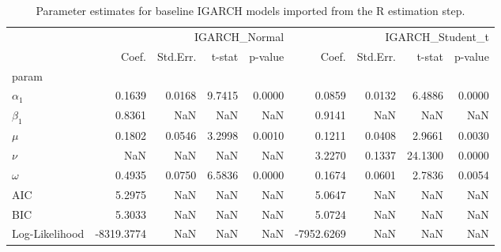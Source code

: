 \begin{table}
\caption{Parameter estimates for baseline IGARCH models imported from the R estimation step.}
\label{tab:igarch_params}
\begin{tabular}{lrrrrrrrr}
\toprule
 & \multicolumn{4}{r}{IGARCH_Normal} & \multicolumn{4}{r}{IGARCH_Student_t} \\
 & Coef. & Std.Err. & t-stat & p-value & Coef. & Std.Err. & t-stat & p-value \\
param &  &  &  &  &  &  &  &  \\
\midrule
$\alpha_1$ & 0.1639 & 0.0168 & 9.7415 & 0.0000 & 0.0859 & 0.0132 & 6.4886 & 0.0000 \\
$\beta_1$ & 0.8361 & NaN & NaN & NaN & 0.9141 & NaN & NaN & NaN \\
$\mu$ & 0.1802 & 0.0546 & 3.2998 & 0.0010 & 0.1211 & 0.0408 & 2.9661 & 0.0030 \\
$\nu$ & NaN & NaN & NaN & NaN & 3.2270 & 0.1337 & 24.1300 & 0.0000 \\
$\omega$ & 0.4935 & 0.0750 & 6.5836 & 0.0000 & 0.1674 & 0.0601 & 2.7836 & 0.0054 \\
AIC & 5.2975 & NaN & NaN & NaN & 5.0647 & NaN & NaN & NaN \\
BIC & 5.3033 & NaN & NaN & NaN & 5.0724 & NaN & NaN & NaN \\
Log-Likelihood & -8319.3774 & NaN & NaN & NaN & -7952.6269 & NaN & NaN & NaN \\
\bottomrule
\end{tabular}
\end{table}
